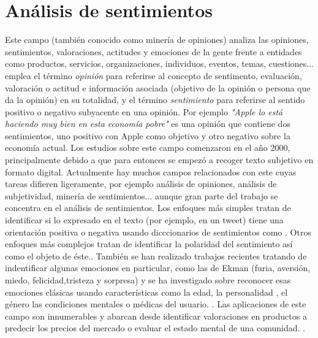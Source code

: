\section*{Análisis de sentimientos}
Este campo (también conocido como minería de opiniones) analiza las opiniones, sentimientos, valoraciones, actitudes y emociones de la gente frente a entidades como productos, servicios, organizaciones, individuos, eventos, temas, cuestiones...\newline
\citet{9781107017894} emplea el término \textsl{opinión} para referirse al concepto de sentimento, evaluación, valoración o actitud e información asociada (objetivo de la opinión o persona que da la opinión) en su totalidad, y el término \textsl{sentimiento} para referirse al sentido positivo o negativo subyacente en una opinión. Por ejemplo \textsl{"Apple lo está haciendo muy bien en esta economía pobre"} es una opinión que contiene dos sentimientos, uno positivo con Apple como objetivo y otro negativo sobre la economía actual.\newline
 Los estudios sobre este campo comenzaron en el año 2000, principalmente debido a que para entonces se empezó a recoger texto subjetivo en formato digital. Actualmente hay muchos campos relacionados con este cuyas tareas difieren ligeramente, por ejemplo análisis de opiniones, análisis de subjetividad, minería de sentimientos... aunque gran parte del trabajo se concentra en el análisis de sentimientos. \newline
Los enfoques más simples tratan de identificar si lo expresado en el texto (por ejemplo, en un tweet) tiene una orientación positiva o negativa usando dicccionarios de sentimientos como \citet{whissell1989dictionary}. Otros enfoques más complejos tratan de identificar la polaridad del sentimiento así como el objeto de éste.\citet{wiebe2005annotating}. También se han realizado trabajos recientes tratando de indentificar algunas emociones en particular, como las de Ekman (furia, aversión, miedo, felicidad,tristeza y sorpresa) y se ha investigado sobre reconocer esas emociones clásicas usando características como la edad, la personalidad , el género las condiciones mentales o médicas del usuario.  \citet{hirschberg2015advances}. \newline
Las aplicaciones de este campo son innumerables y abarcan desde identificar valoraciones en productos \citet{wang2015sentiment} a predecir los precios del mercado o evaluar el estado mental de una comunidad. \citet{bollen2011modeling}.
